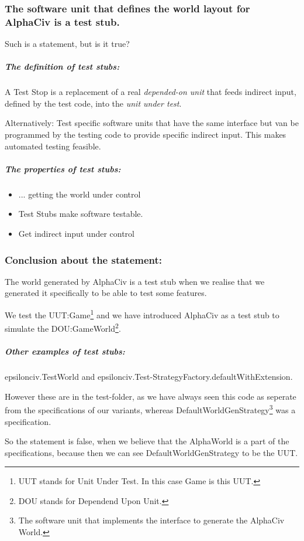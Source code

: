 \subsubsection*{The software unit that defines the world layout for AlphaCiv is a test stub.}
Such is a statement, but is it true? 

\subparagraph*{ The definition of test stubs: }
A Test Stop is a replacement of a real \textsl{depended-on unit} that feeds indirect input, defined by the test code, into the \textsl{unit under test}.

Alternatively: Test specific software units that have the same interface but van be programmed by the testing code to provide specific indirect input.
This makes automated testing feasible. 

\subparagraph*{ The properties of test stubs: }
\begin{itemize} \itemsep1pt \parskip0pt 
\item ... getting the world under control 
\item Test Stubs make software testable.  
\item Get indirect input under control
\end{itemize}

\subsubsection*{ Conclusion about the statement: }

The world generated by AlphaCiv is a test stub when we realise that we generated it specifically to be able to test some features.

We test the UUT:Game\footnote{UUT stands for Unit Under Test. In this case Game is this UUT.} and we have introduced AlphaCiv as a test stub to simulate the DOU:GameWorld\footnote{DOU stands for Dependend Upon Unit.}. 

\subparagraph*{Other examples of test stubs:}
epsilonciv.TestWorld and epsilonciv.Test-StrategyFactory.defaultWithExtension.

However these are in the test-folder, as we have always seen this code as seperate from the specifications of our variants, whereas DefaultWorldGenStrategy\footnote{The software unit that implements the interface to generate the AlphaCiv World.} was a specification. 

So the statement is false, when we believe that the AlphaWorld is a part of the specifications, because then we can see DefaultWorldGenStrategy to be the UUT.
